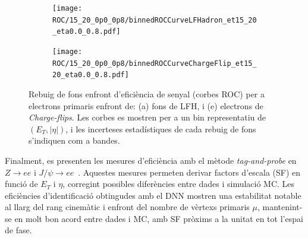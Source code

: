 \begin{figure}[h]
  \centering
  \begin{subfigure}[t]{0.5\linewidth}
    \centering
    \texttt{[image: ROC/15\_20\_0p0\_0p8/binnedROCCurveLFHadron\_et15\_20\_eta0.0\_0.8.pdf]}
    \caption{}
    \label{res:roc_pc}
  \end{subfigure}\hfill
  \begin{subfigure}[t]{0.5\linewidth}
    \centering
    \texttt{[image: ROC/15\_20\_0p0\_0p8/binnedROCCurveChargeFlip\_et15\_20\_eta0.0\_0.8.pdf]}
    \caption{}
    \label{res:roc_hf}
  \end{subfigure}

  \caption{Rebuig de fons enfront d’eficiència de senyal (corbes ROC) per a electrons primaris enfront de:
  (a) fons de LFH,  
  i (e) electrons de \textit{Charge-flips}.  
  Les corbes es mostren per a un bin representatiu de $(E_{T}, |\eta|)$, i les incerteses estadístiques de cada rebuig de fons s’indiquen com a bandes.}
  \label{res:roc_mainbkg}
\end{figure}

Finalment, es presenten les mesures d’eficiència amb el mètode \textit{tag-and-probe} en $Z\to ee$ i $J/\psi\to ee$~\cite{latest_electron_paper_2024}.  
Aquestes mesures permeten derivar factors d’escala (SF) en funció de $E_T$ i $\eta$, corregint possibles diferències entre dades i simulació MC.  
Les eficiències d’identificació obtingudes amb el DNN mostren una estabilitat notable al llarg del rang cinemàtic i enfront del nombre de vèrtexs primaris $\mu$, mantenint-se en molt bon acord entre dades i MC, amb SF pròxims a la unitat en tot l’espai de fase.  

